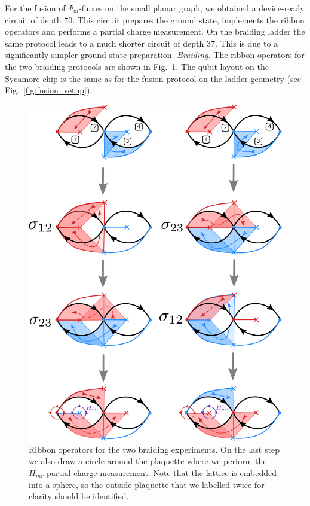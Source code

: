 \documentclass[two column]{article}
\begin{document}
For the fusion of $\Psi_m$-fluxes on the small planar graph, we obtained a device-ready circuit of depth 70. This circuit prepares the ground state, implements the ribbon operators and performs a partial charge measurement. 
On the braiding ladder the same protocol leads to a much shorter circuit of depth 37. This is due to a significantly simpler ground state preparation.
\emph{Braiding.} The ribbon operators for the two braiding protocols are shown in Fig.~\ref{fig:braiding_setup}. The qubit layout on the Sycamore chip is the same as for the fusion protocol on the ladder geometry (see Fig.~\ref{fig:fusion_setup}).
\begin{figure}
	\centering
	\includegraphics[width=\linewidth]{Figures/braiding_setup.pdf}
	\caption{Ribbon operators for the two braiding experiments. On the last step we also draw a circle around the plaquette where we perform the $H_{mr}$-partial charge measurement. Note that the lattice is embedded into a sphere, so the outside plaquette that we labelled twice for clarity should be identified.}
	\label{fig:braiding_setup}
\end{figure}
\end{document}
